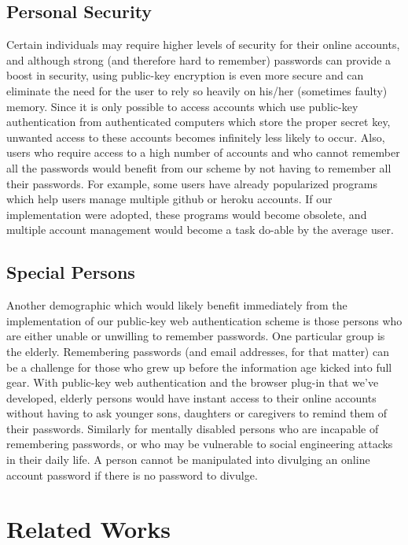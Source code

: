 \documentclass[11pt]{article}
\begin{document}
\subsection{Personal Security} \label{subsec:personalsecurity}
Certain individuals may require higher levels of security for their online accounts, and although strong (and therefore hard to remember) passwords can provide a boost in security, using public-key encryption is even more secure and can eliminate the need for the user to rely so heavily on his/her (sometimes faulty) memory.  Since it is only possible to access accounts which use public-key authentication from authenticated computers which store the proper secret key, unwanted access to these accounts becomes infinitely less likely to occur.  Also, users who require access to a high number of accounts and who cannot remember all the passwords would benefit from our scheme by not having to remember all their passwords.  For example, some users have already popularized programs which help users manage multiple github or heroku accounts\cite{multipleHeroku}.  If our implementation were adopted, these programs would become obsolete, and multiple account management would become a task do-able by the average user.

\subsection{Special Persons} \label{subsec:specialpersons}
Another demographic which would likely benefit immediately from the implementation of our public-key web authentication scheme is those persons who are either unable or unwilling to remember passwords.  One particular group is the elderly.  Remembering passwords (and email addresses, for that matter) can be a challenge for those who grew up before the information age kicked into full gear.  With public-key web authentication and the browser plug-in that we've developed, elderly persons would have instant access to their online accounts without having to ask younger sons, daughters or caregivers to remind them of their passwords.  Similarly for mentally disabled persons who are incapable of remembering passwords, or who may be vulnerable to social engineering attacks in their daily life.  A person cannot be manipulated into divulging an online account password if there is no password to divulge.

\section{Related Works} \label{sec:relatedWorks}
\end{document}
